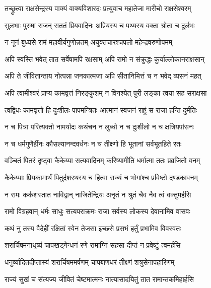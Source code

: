 
\twolineshloka
{तच्छ्रुत्वा राक्षसेन्द्रस्य वाक्यं वाक्यविशारदः}
{प्रत्युवाच महातेजा मारीचो राक्षसेश्वरम्} %

\twolineshloka
{सुलभाः पुरुषा राजन् सततं प्रियवादिनः}
{अप्रियस्य च पथ्यस्य वक्ता श्रोता च दुर्लभः} %

\twolineshloka
{न नूनं बुध्यसे रामं महावीर्यगुणोन्नतम्}
{अयुक्तचारश्चपलो महेन्द्रवरुणोपमम्} %

\twolineshloka
{अपि स्वस्ति भवेत् तात सर्वेषामपि रक्षसाम्}
{अपि रामो न संक्रुद्धः कुर्याल्लोकानराक्षसान्} %

\twolineshloka
{अपि ते जीवितान्ताय नोत्पन्ना जनकात्मजा}
{अपि सीतानिमित्तं च न भवेद् व्यसनं महत्} %

\twolineshloka
{अपि त्वामीश्वरं प्राप्य कामवृत्तं निरङ्कुशम्}
{न विनश्येत् पुरी लङ्का त्वया सह सराक्षसा} %

\twolineshloka
{त्वद्विधः कामवृत्तो हि दुःशीलः पापमन्त्रितः}
{आत्मानं स्वजनं राष्ट्रं स राजा हन्ति दुर्मतिः} %

\twolineshloka
{न च पित्रा परित्यक्तो नामर्यादः कथंचन}
{न लुब्धो न च दुःशीलो न च क्षत्रियपांसनः} %

\twolineshloka
{न च धर्मगुणैर्हीनः कौसल्यानन्दवर्धनः}
{न च तीक्ष्णो हि भूतानां सर्वभूतहिते रतः} %

\twolineshloka
{वञ्चितं पितरं दृष्ट्वा कैकेय्या सत्यवादिनम्}
{करिष्यामीति धर्मात्मा ततः प्रव्रजितो वनम्} %

\twolineshloka
{कैकेय्याः प्रियकामार्थं पितुर्दशरथस्य च}
{हित्वा राज्यं च भोगांश्च प्रविष्टो दण्डकावनम्} %

\twolineshloka
{न रामः कर्कशस्तात नाविद्वान् नाजितेन्द्रियः}
{अनृतं न श्रुतं चैव नैव त्वं वक्तुमर्हसि} %

\twolineshloka
{रामो विग्रहवान् धर्मः साधुः सत्यपराक्रमः}
{राजा सर्वस्य लोकस्य देवानामिव वासवः} %

\twolineshloka
{कथं नु तस्य वैदेहीं रक्षितां स्वेन तेजसा}
{इच्छसे प्रसभं हर्तुं प्रभामिव विवस्वतः} %

\twolineshloka
{शरार्चिषमनाधृष्यं चापखड्गेन्धनं रणे}
{रामाग्निं सहसा दीप्तं न प्रवेष्टुं त्वमर्हसि} %

\twolineshloka
{धनुर्व्यादितदीप्तास्यं शरार्चिषममर्षणम्}
{चापबाणधरं तीक्ष्णं शत्रुसेनापहारिणम्} %

\twolineshloka
{राज्यं सुखं च संत्यज्य जीवितं चेष्टमात्मनः}
{नात्यासादयितुं तात रामान्तकमिहार्हसि} %

